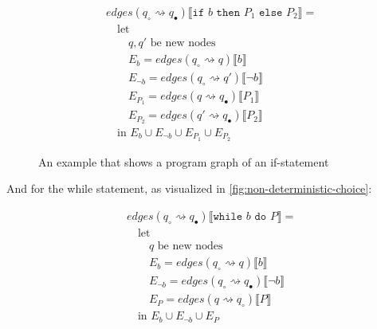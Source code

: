 \begin{equation}
    \begin{split}
        &edges(q_\circ \rightsquigarrow q_\bullet) \llbracket \texttt{if } b \texttt{ then } P_1 \texttt{ else } P_2 \rrbracket = \\
        &\quad \text{let } \\
        &\quad\quad q, q' \text{ be new nodes} \\
        &\quad\quad E_{b} = edges(q_\circ \rightsquigarrow q) \llbracket b \rrbracket \\
        &\quad\quad E_{\neg b} = edges(q_\circ \rightsquigarrow q') \llbracket \neg b \rrbracket \\
        &\quad\quad E_{P_1}= edges(q \rightsquigarrow q_\bullet) \llbracket P_1 \rrbracket \\
        &\quad\quad E_{P_2}= edges(q' \rightsquigarrow q_\bullet) \llbracket P_2 \rrbracket \\
        &\quad \text{in } E_{b} \cup E_{\neg b} \cup E_{P_1} \cup E_{P_2}
    \end{split}\label{eq:equation8}
\end{equation}

\begin{figure}[htb!]
    \center
    
    \caption{An example that shows a program graph of an if-statement}
    \label{fig:tikz-program-graph-if}
\end{figure}

And for the while statement, as visualized in \autoref{fig:non-deterministic-choice}:

\begin{equation}
    \begin{split}
        &edges(q_\circ \rightsquigarrow q_\bullet) \llbracket \texttt{while } b \texttt{ do } P \rrbracket = \\
        &\quad \text{let } \\
        &\quad\quad q \text{ be new nodes} \\
        &\quad\quad E_{b} = edges(q_\circ \rightsquigarrow q) \llbracket b \rrbracket \\
        &\quad\quad E_{\neg b} = edges(q_\circ \rightsquigarrow q_\bullet) \llbracket \neg b \rrbracket \\
        &\quad\quad E_{P} = edges(q \rightsquigarrow q_\circ) \llbracket P \rrbracket \\
        &\quad \text{in } E_{b} \cup E_{\neg b} \cup E_{P}
    \end{split}\label{eq:equation9}
\end{equation}

